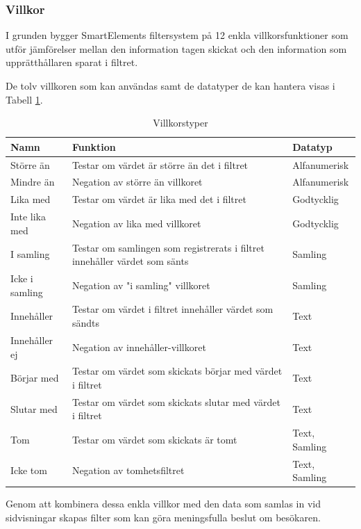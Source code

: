 \subsubsection{Villkor}

I grunden bygger SmartElements filtersystem på 12 enkla villkorsfunktioner som utför jämförelser mellan den information tagen skickat och den information som upprätthållaren sparat i filtret.

De tolv villkoren som kan användas samt de datatyper de kan hantera visas i Tabell \ref{table:villkor}.

\begin{table}
    \begin{tabular}{|l|p{8cm}|l|}
    \hline
    Namn & Funktion & Datatyp \\
    \hline
    Större än & Testar om värdet är större än det i filtret & Alfanumerisk \\
    \hline
    Mindre än & Negation av större än villkoret & Alfanumerisk \\
    \hline
    Lika med & Testar om värdet är lika med det i filtret & Godtycklig \\
    \hline
    Inte lika med & Negation av lika med villkoret & Godtycklig \\
    \hline
    I samling & Testar om samlingen som registrerats i filtret innehåller värdet som sänts & Samling \\
    \hline
    Icke i samling & Negation av "i samling" villkoret & Samling \\
    \hline
    Innehåller & Testar om värdet i filtret innehåller värdet som sändts & Text \\
    \hline
    Innehåller ej & Negation av innehåller-villkoret & Text \\
    \hline
    Börjar med & Testar om värdet som skickats börjar med värdet i filtret & Text \\
    \hline
    Slutar med & Testar om värdet som skickats slutar med värdet i filtret & Text \\
    \hline
    Tom & Testar om värdet som skickats är tomt & Text, Samling \\
    \hline
    Icke tom & Negation av tomhetsfiltret & Text, Samling \\
    \hline
    \end{tabular}
    \caption{Villkorstyper}
    \label{table:villkor}
\end{table}

Genom att kombinera dessa enkla villkor med den data som samlas in vid sidvisningar skapas filter som kan göra meningsfulla beslut om besökaren.

